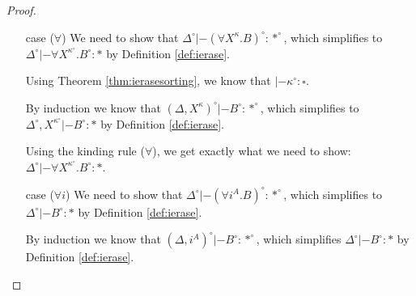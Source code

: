 \begin{proof}
\begin{itemize}
\item[case] ($\forall$)
	We need to show that
	$\Delta^\circ |- (\forall X^\kappa.B)^\circ : *^\circ$,
	which simplifies to
	$\Delta^\circ |- \forall X^{\kappa^\circ}.B^\circ : *$
	by Definition \ref{def:ierase}.

	Using Theorem \ref{thm:ierasesorting}, we know that
	$|- \kappa^\circ : \square$.

	By induction we know that
	$(\Delta,X^\kappa)^\circ |- B^\circ : *^\circ$,
	which simplifies to
	$\Delta^\circ,X^{\kappa^\circ} |- B^\circ : *$
	by Definition \ref{def:ierase}.

	Using the kinding rule ($\forall$), we get exactly
	what we need to show:
	$\Delta^\circ |- \forall X^{\kappa^\circ}.B^\circ : *$.

\item[case] ($\forall i$)
	We need to show that
	$\Delta^\circ |- (\forall i^A.B)^\circ : *^\circ$,
	which simplifies to $\Delta^\circ |- B^\circ : *$
	by Definition \ref{def:ierase}.

	By induction we know that
	$(\Delta,i^A)^\circ |- B^\circ : *^\circ$,
	which simplifies $\Delta^\circ |- B^\circ : *$
	by Definition \ref{def:ierase}.
\end{itemize}\qedhere
\end{proof}

